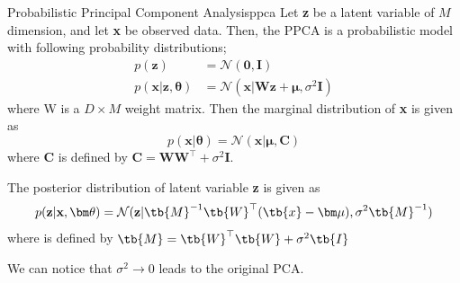 \documentclass{article}
\begin{document}
        \begin{defn}{Probabilistic Principal Component Analysis}{ppca}
            Let \textbf{z} be a latent variable of $M$ dimension, and let \textbf{x} be observed data. Then, the PPCA is a probabilistic model with following
            probability distributions;
            \begin{align*}
                p(\textbf{z})&=\mathcal{N}(\textbf{0},\textbf{I}) \\
                p(\textbf{x}|\textbf{z},\bm\theta)&=\mathcal{N}(\textbf{x}|\textbf{Wz}+\bm\mu,\sigma^2\textbf{I})
            \end{align*}
            where \tb W is a $D \times M$ weight matrix.
            Then the marginal distribution of \textbf{x} is given as
            \[
                p(\textbf{x}|\bm\theta)=\mathcal{N}(\textbf{x}|\bm\mu,\textbf{C})
            \]
            where \textbf{C} is defined by $\textbf{C}=\textbf{W}\textbf{W}^\top + \sigma^2\textbf{I}$.

            The posterior distribution of latent variable \textbf{z} is given as
            \[
                p(\textbf{z}|\textbf{x},\bm\theta)=\mathcal{N}(\textbf{z}|\tb{M}^{-1}\tb{W}^\top(\tb{x}-\bm\mu),\sigma^2\tb{M}^{-1})
            \]
            where  is defined by $\tb{M}=\tb{W}^\top\tb{W}+\sigma^2\tb{I}$
        \end{defn}

        We can notice that $\sigma^2 \rightarrow 0$ leads to the original PCA.
\end{document}
